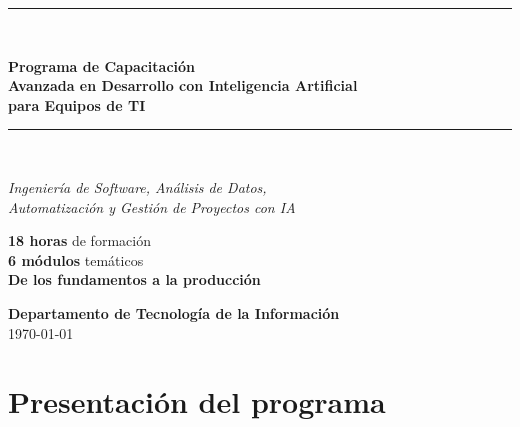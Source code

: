 \documentclass[11pt,a4paper]{article}
\begin{document}
\begin{titlepage}
  \thispagestyle{empty}
  \begin{center}
    \vspace*{1.5cm}
    \textcolor{primario}{\rule{\linewidth}{1.2pt}}\\[0.4cm]
    {\Huge\bfseries\textcolor{primario}{Programa de Capacitación}\\[0.3cm]
     Avanzada en Desarrollo con Inteligencia Artificial\\[0.3cm]
     para Equipos de TI\par}
    \vspace{0.4cm}
    \textcolor{primario}{\rule{\linewidth}{1.2pt}}\\[1.2cm]

    {\Large\color{textoGris}\itshape Ingeniería de Software, Análisis de Datos,\\
     Automatización y Gestión de Proyectos con IA\par}

    \vspace{2cm}
    \begin{tcolorbox}[enhanced, width=0.7\linewidth, colback=fondoClaro,
        colframe=secundario, boxrule=0.5pt, halign=center, sharp corners]
      \large
      \textbf{18 horas} de formación\\[0.2cm]
      \textbf{6 módulos} temáticos\\[0.2cm]
      \textbf{De los fundamentos a la producción}
    \end{tcolorbox}

    \vfill
    {\large\color{textoGris}%
     \textbf{Departamento de Tecnología de la Información}\\[0.2cm]
     \today\par}
    \vspace{1cm}
  \end{center}
\end{titlepage}

\tableofcontents
\newpage

\section{Presentación del programa}
\end{document}
